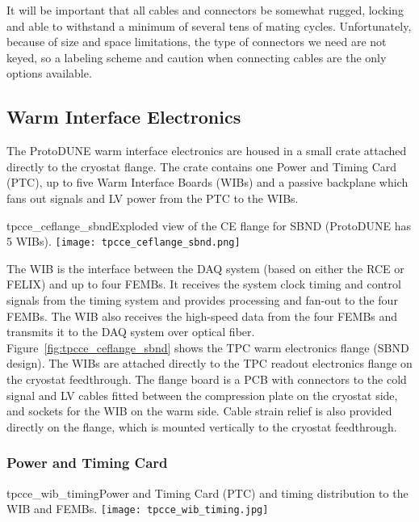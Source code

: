 It will be important that all cables and connectors be somewhat rugged,
locking and able to withstand a minimum of several tens of mating cycles.
Unfortunately, because of size and space limitations, the type of connectors we need are not keyed,
so a labeling scheme and caution when connecting cables are the only options available.

\subsection{Warm Interface Electronics}
\label{subsec:warm_interface_elec}

The ProtoDUNE warm interface electronics are housed in a small crate
attached directly to the cryostat flange.  The crate contains one
Power and Timing Card (PTC), up to five Warm Interface Boards (WIBs) and a passive
backplane which fans out signals and LV power from the PTC to the WIBs.

\begin{cdrfigure}{tpcce_ceflange_sbnd}{Exploded view of 
the CE flange for SBND (ProtoDUNE has 5 WIBs).}
\texttt{[image: tpcce\_ceflange\_sbnd.png]}
\end{cdrfigure}

The WIB is the interface between the
DAQ system (based on either the RCE or FELIX) and up to four
FEMBs. It receives the system clock timing and control signals from the
timing system and provides processing and fan-out to the four
FEMBs. The WIB also receives the high-speed data from the four 
FEMBs and transmits it to the DAQ system over optical
fiber.  Figure~\ref{fig:tpcce_ceflange_sbnd} shows the TPC warm electronics
flange (SBND design). The WIBs are attached directly to the TPC
readout electronics flange on the cryostat feedthrough. The flange
board is a PCB with connectors to the cold signal and LV cables fitted
between the compression plate on the cryostat side, and sockets for
the WIB on the warm side. Cable strain relief is also provided
directly on the flange, which is mounted vertically to the cryostat
feedthrough.

\subsubsection{Power and Timing Card}
\label{subsubsec:power_timing_card}

\begin{cdrfigure}{tpcce_wib_timing}{Power and Timing Card (PTC) 
and timing distribution to the WIB and FEMBs.}
\texttt{[image: tpcce\_wib\_timing.jpg]}
\end{cdrfigure}

